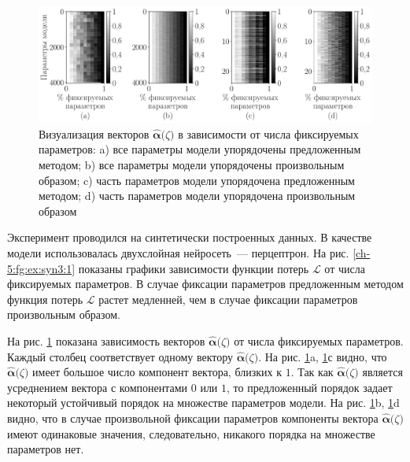 \begin{figure}[h!t]\center
\includegraphics[width=1\textwidth]{results/order/generate_data_neural_matshow}
\caption{Визуализация векторов $\hat{\bm{\alpha}}\bigr(\zeta\bigr)$ в зависимости от числа фиксируемых параметров: a) все параметры модели упорядочены предложенным методом; b) все параметры модели упорядочены произвольным образом; c) часть параметров модели упорядочена предложенным методом; d) часть параметров модели упорядочена произвольным образом}
\label{ch-5:fg:ex:syn3:2}
\end{figure}

Эксперимент проводился на синтетически построенных данных. В качестве модели использовалась двухслойная нейросеть~--- перцептрон.
На рис. \ref{ch-5:fg:ex:syn3:1} показаны графики зависимости функции потерь $\mathcal{L}$ от числа фиксируемых параметров. В случае фиксации параметров предложенным методом функция потерь $\mathcal{L}$ растет медленней, чем в случае фиксации параметров произвольным образом.

На рис. \ref{ch-5:fg:ex:syn3:2} показана зависимость векторов $\hat{\bm{\alpha}}\bigr(\zeta\bigr)$ от числа фиксируемых параметров. Каждый столбец соответствует одному вектору $\hat{\bm{\alpha}}\bigr(\zeta\bigr)$. На рис. \ref{ch-5:fg:ex:syn3:2}a, \ref{ch-5:fg:ex:syn3:2}с видно, что $\hat{\bm{\alpha}}\bigr(\zeta\bigr)$ имеет большое число компонент вектора, близких к $1$. Так как $\hat{\bm{\alpha}}\bigr(\zeta\bigr)$ является усреднением вектора с компонентами $0$ или $1$, то предложенный порядок задает некоторый устойчивый порядок на множестве параметров модели. На рис. \ref{ch-5:fg:ex:syn3:2}b, \ref{ch-5:fg:ex:syn3:2}d видно, что в случае произвольной фиксации параметров компоненты вектора $\hat{\bm{\alpha}}\bigr(\zeta\bigr)$ имеют одинаковые значения, следовательно, никакого порядка на множестве параметров нет.

